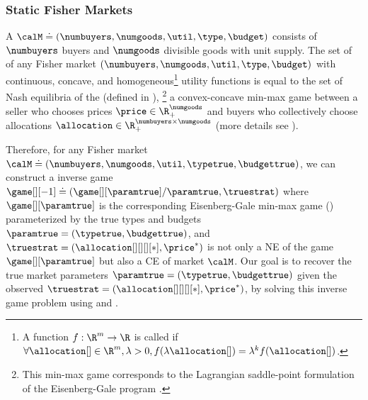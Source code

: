 \subsubsection{Static Fisher Markets}

A  $\calM \doteq (\numbuyers, \numgoods, \util, \type, \budget)$ consists of $\numbuyers$ buyers and $\numgoods$ divisible goods with unit supply\citep{brainard2000compute}. The set of  of any Fisher market $(\numbuyers, \numgoods, \util, \type, \budget)$ with continuous, concave, and homogeneous\footnote{A function $f: \R^m \to \R$ is called  if $\forall \allocation[ ] \in \R^m, \lambda > 0, f(\lambda \allocation[ ]) = \lambda^k f(\allocation[ ])$.} utility functions is equal to the set of Nash equilibria of the  (defined in ),%
\footnote{This min-max game corresponds to the Lagrangian saddle-point formulation of the Eisenberg-Gale program \cite{gale1989theory, jain2005market}.} 
a convex-concave min-max game between a seller who chooses prices $\price \in \R_+^{\numgoods}$ and buyers who collectively choose allocations
$\allocation \in \R_+^{\numbuyers \times \numgoods}$ (more details see ).


Therefore, for any Fisher market $\calM \doteq (\numbuyers, \numgoods, \util, \typetrue, \budgettrue)$, 
we can construct a inverse game $\game[][-1] \doteq 
(\game[][\paramtrue]/\paramtrue , \truestrat)$ where $\game[][\paramtrue]$ is the corresponding Eisenberg-Gale min-max game () parameterized by the true types and budgets $\paramtrue=(\typetrue, \budgettrue)$, and $\truestrat=(\allocation[][][][*], \price^*)$ is not only a NE of the game $\game[][\paramtrue]$ but also a CE of market $\calM$. Our goal is to recover the true market parameters $\paramtrue=(\typetrue, \budgettrue)$ given the observed $\truestrat=(\allocation[][][][*], \price^*)$, by solving this inverse game problem using  and . 



